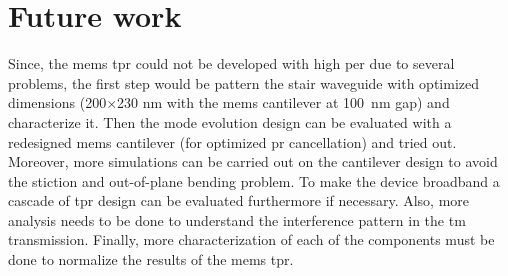 \documentclass[../report.tex]{subfiles}
\begin{document}
\section{Future work} 
Since, the \gls{mems} \gls{tpr} could not be developed with high \gls{per} due to several problems, the first step would be pattern the stair waveguide with optimized dimensions (200$\times$230 nm with the \gls{mems} cantilever at \SI{100}{\nano \meter} gap) and characterize it. Then the mode evolution design can be evaluated with a redesigned \gls{mems} cantilever (for optimized \gls{pr} cancellation) and tried out. Moreover, more simulations can be carried out on the cantilever design to avoid the stiction and out-of-plane bending problem. To make the device broadband a cascade of \gls{tpr} design can be evaluated furthermore if necessary. Also, more analysis needs to be done to understand the interference pattern in the \gls{tm} transmission. Finally, more characterization of each of the components must be done to normalize the results of the \gls{mems} \gls{tpr}.
\end{document}
